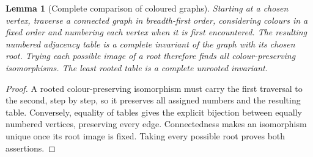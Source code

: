 \documentclass[11pt,a4paper]{article}
\newtheorem{lemma}{Lemma}\newtheorem{theorem}{Theorem}
\begin{document}
\begin{lemma}[Complete comparison of coloured graphs]
Starting at a chosen vertex, traverse a connected graph in breadth-first
order, considering colours in a fixed order and numbering each vertex
when it is first encountered. The resulting numbered adjacency table
is a complete invariant of the graph with its chosen root. Trying each
possible image of a root therefore finds all colour-preserving
isomorphisms. The least rooted table is a complete unrooted invariant.
\end{lemma}
\begin{proof}
A rooted colour-preserving isomorphism must carry the first traversal
to the second, step by step, so it preserves all assigned numbers and
the resulting table. Conversely, equality of tables gives the explicit
bijection between equally numbered vertices, preserving every edge.
Connectedness makes an isomorphism unique once its root image is fixed.
Taking every possible root proves both assertions.
\end{proof}
\end{document}

